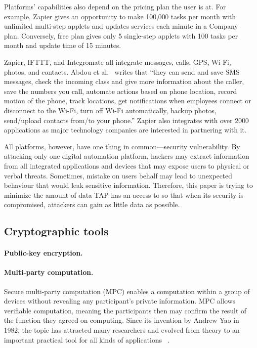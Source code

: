 Platforms' capabilities also depend on the pricing plan the user is at. For
example, Zapier gives an opportunity to make 100,000 tasks per month with
unlimited multi-step applets and updates services each minute in a Company
plan. Conversely, free plan gives only 5 single-step applets with 100 tasks per
month and update time of 15 minutes.

Zapier, IFTTT, and Integromate all integrate messages, calls, GPS, Wi-Fi,
photos, and contacts. Abdou et al.~\cite{DBLP:conf/icict2/AbdouEF21} writes that
``they can send and save SMS messages, check the incoming class and give more
information about the caller, save the numbers you call, automate actions based
on phone location, record motion of the phone, track locations, get
notifications when employees connect or disconnect to the Wi-Fi, turn off Wi-Fi
automatically, backup photos, send/upload contacts from/to your phone.'' Zapier
also integrates with over 2000 applications as major technology companies are
interested in partnering with it.

All platforms, however, have one thing in common---security vulnerability. By
attacking only one digital automation platform, hackers may extract information
from all integrated applications and devices that may expose users to physical
or verbal threats. Sometimes, mistake on users behalf may lead to unexpected
behaviour that would leak sensitive information. Therefore, this paper is trying
to minimize the amount of data TAP has an access to so that when its security is
compromised, attackers can gain as little data as possible.

\subsection{Cryptographic tools}

\paragraph{Public-key encryption.}


\paragraph{Multi-party computation.}

Secure multi-party computation (MPC) enables a computation within a group of
devices without revealing any participant's private information. MPC allows
verifiable computation, meaning the participants then may confirm the result of
the function they agreed on computing. Since its invention by Andrew Yao in
1982, the topic has attracted many researchers and evolved from theory to an
important practical tool for all kinds of applications
~\cite{DBLP:journals/ftsec/EvansKR18}.

